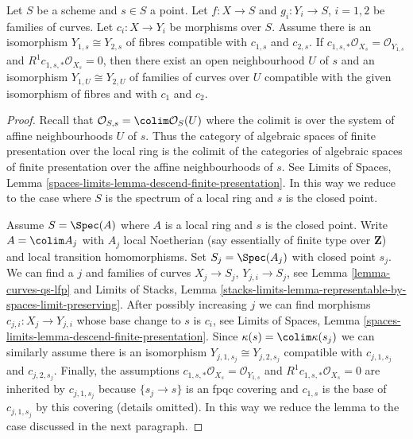 \begin{lemma}
\label{lemma-contract-basic-uniqueness}
Let $S$ be a scheme and $s \in S$ a point.
Let $f : X \to S$ and $g_i : Y_i \to S$, $i = 1, 2$ be families of curves.
Let $c_i : X \to Y_i$ be morphisms over $S$.
Assume there is an isomorphism $Y_{1, s} \cong Y_{2, s}$
of fibres compatible with $c_{1, s}$ and $c_{2, s}$.
If $c_{1, s, *}\mathcal{O}_{X_s} = \mathcal{O}_{Y_{1, s}}$ and
$R^1c_{1, s, *}\mathcal{O}_{X_s} = 0$, then there exist an
open neighbourhood $U$ of $s$ and an isomorphism
$Y_{1, U} \cong Y_{2, U}$ of families of curves over $U$
compatible with the given isomorphism of fibres and with
$c_1$ and $c_2$.
\end{lemma}

\begin{proof}
Recall that $\mathcal{O}_{S, s} = \colim \mathcal{O}_S(U)$ where
the colimit is over the system of affine neighbourhoods $U$ of $s$.
Thus the category of algebraic spaces of finite presentation over
the local ring is the colimit of the categories of algebraic spaces
of finite presentation over the affine neighbourhoods of $s$.
See Limits of Spaces, Lemma
\ref{spaces-limits-lemma-descend-finite-presentation}.
In this way we reduce to the case where $S$ is the spectrum of
a local ring and $s$ is the closed point.

\medskip\noindent
Assume $S = \Spec(A)$ where $A$ is a local ring and $s$ is the closed point.
Write $A = \colim A_j$ with $A_j$ local Noetherian (say essentially
of finite type over $\mathbf{Z}$) and local transition homomorphisms.
Set $S_j = \Spec(A_j)$ with closed point $s_j$. We can find a
$j$ and families of curves $X_j \to S_j$, $Y_{j, i} \to S_j$,
see Lemma \ref{lemma-curves-qs-lfp} and
Limits of Stacks, Lemma
\ref{stacks-limits-lemma-representable-by-spaces-limit-preserving}.
After possibly increasing $j$ we can find morphisms
$c_{j, i} : X_j \to Y_{j, i}$ whose base change to $s$ is $c_i$, see
Limits of Spaces, Lemma
\ref{spaces-limits-lemma-descend-finite-presentation}.
Since $\kappa(s) = \colim \kappa(s_j)$ we can similarly
assume there is an isomorphism $Y_{j, 1, s_j} \cong Y_{j, 2, s_j}$
compatible with $c_{j, 1, s_j}$ and $c_{j, 2, s_j}$.
Finally, the assumptions
$c_{1, s, *}\mathcal{O}_{X_s} = \mathcal{O}_{Y_{1, s}}$ and
$R^1c_{1, s, *}\mathcal{O}_{X_s} = 0$
are inherited by $c_{j, 1, s_j}$ because
$\{s_j \to s\}$ is an fpqc covering and
$c_{1, s}$ is the base of $c_{j, 1, s_j}$ by this covering (details omitted).
In this way we reduce the lemma to the case discussed in the next paragraph.


\end{proof}
